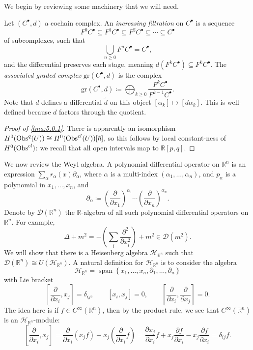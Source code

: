 We begin by reviewing some machinery that we will need.

\begin{definition}\label{dfn:5.0.2}
	Let $(C^{\bullet} ,d)$ a cochain complex. An \emph{increasing filtration} on $C^{\bullet} $ is a sequence
	\[
		F^0C^{\bullet} \subseteq F^1C^{\bullet} \subseteq F^2C^{\bullet} \subseteq \cdots \subseteq C^{\bullet} 
	\]
	of subcomplexes, such that
	\[
		\bigcup_{n\geq 0} F^nC^{\bullet} =C^{\bullet} ,
	\]
	and the differential preserves each stage, meaning $d(F^kC^{\bullet} )\subseteq F^kC^{\bullet} $. The \emph{associated graded complex} $\mathrm{gr} (C^{\bullet} ,d)$ is the complex
	\[
		\mathrm{gr} (C^{\bullet} ,d) \coloneqq \bigoplus_{k\geq 0} \frac{F^kC^{\bullet} }{F^{k-1} C^{\bullet} } 
	.\]
	Note that $d$ defines a differential $\widetilde{d} $ on this object $[\alpha _k]\mapsto [d\alpha _k]$. This is well-defined because $d$ factors through the quotient.
\end{definition}

\begin{proof}[Proof of \cref{lma:5.0.1}]
	There is apparently an isomorphism $H^0(\operatorname{Obs}^q(U))\cong H^0(\operatorname{Obs}^{cl} (U))[\hbar ]$, so this follows by local constant-ness of $H^0(\operatorname{Obs}^{cl} )$: we recall that all open intervals map to $\mathbb{R} [p,q]$.
\end{proof}




We now review the Weyl algebra. A polynomial differential operator on $\mathbb{R} ^n$ is an expression $\sum_{\alpha } r_\alpha (x)\partial _\alpha $, where $\alpha $ is a multi-index $\left( \alpha _1, \ldots ,\alpha _n \right) $, and $p_\alpha $ is a polynomial in $x_1, \ldots , x_n$, and
\[
	\partial _\alpha  \coloneqq \left( \frac{\partial }{\partial x_1}  \right) ^{\alpha _1} \cdots \left( \frac{\partial }{\partial x_n}  \right) ^{\alpha _n} 
.\]
Denote by $\mathscr{D} (\mathbb{R} ^n)$ the $\mathbb{R} $-algebra of all such polynomial differential operators on $\mathbb{R} ^n$. For example,
\[
	\Delta +m^2 = -\left( \sum_{i} \frac{\partial ^2}{\partial x_i^2}  \right) +m^2\in \mathscr{D} (m^2)
.\]
We will show that there is a Heisenberg algebra $\mathcal{H} _{\mathbb{R} ^n} $ such that $\mathscr{D} (\mathbb{R} ^n) \cong U(\mathcal{H} _{\mathbb{R} ^n} )$. A natural definition for $\mathcal{H} _{\mathbb{R} ^n} $ is to consider the algebra
\[
	\mathcal{H} _{\mathbb{R} ^n} =\operatorname{span} \left\{ x_1, \ldots ,x_n , \partial_1, \ldots , \partial _n \right\} 
\]
with Lie bracket
\[
	\left[ \frac{\partial }{\partial x_i} ,x_j \right] =\delta _{ij} ,\qquad \left[ x_i,x_j \right] =0,\qquad \left[ \frac{\partial }{\partial x_i} ,\frac{\partial }{\partial x_j}  \right] =0
.\]
The idea here is if $f\in C^\infty (\mathbb{R} ^n)$, then by the product rule, we see that $C^\infty (\mathbb{R} ^n)$ is an $\mathcal{H} _{\mathbb{R} ^n} $-module:
\[
	\left[ \frac{\partial }{\partial x_i} ,x_j \right] =\frac{\partial }{\partial x_i} (x_j f) - x_j \left( \frac{\partial }{\partial x_i} f \right) =\frac{\partial x_j}{\partial x_i}f +x_j\frac{\partial f}{\partial x_i} -x_j \frac{\partial f}{\partial x_i} =\delta _{ij} f
.\]

